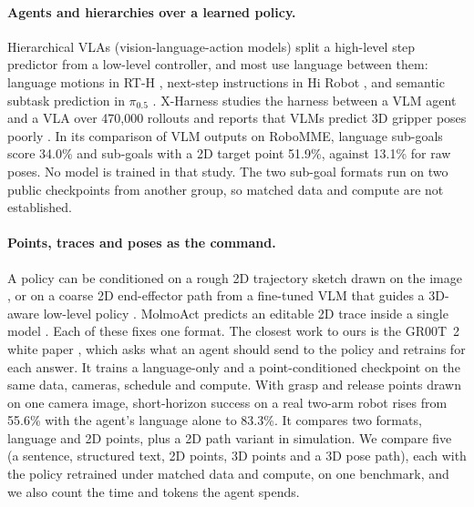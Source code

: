 \paragraph{Agents and hierarchies over a learned policy.}
Hierarchical VLAs (vision-language-action models) split a high-level step
predictor from a low-level controller, and most use language between them:
language motions in RT-H \citep{belkhale2024rth}, %
next-step instructions in Hi Robot \citep{shi2025hirobot}, %
and semantic subtask prediction in $\pi_{0.5}$ \citep{black2025pi05}.
X-Harness studies the harness between a VLM agent and a VLA over 470,000
rollouts and reports that VLMs predict 3D gripper poses poorly
\citep{lai2026xharness}. %
In its comparison of VLM outputs on RoboMME, language sub-goals score 34.0\%
and sub-goals with a 2D target point 51.9\%, against 13.1\% for raw poses.
No model is trained in that study. The two sub-goal formats run on two
public checkpoints from another group, so matched data and compute are not
established.

\paragraph{Points, traces and poses as the command.}
A policy can be conditioned on a rough 2D trajectory sketch drawn on the image
\citep{gu2023rttrajectory}, %
or on a coarse 2D end-effector path from a fine-tuned VLM that guides a
3D-aware low-level policy \citep{li2025hamster}. %
MolmoAct predicts an editable 2D trace inside a single model
\citep{lee2025molmoact}. %
Each of these fixes one format. The closest work to ours is the GR00T~2
white paper \citep{nvidia2026gr00t2}, %
which asks what an agent should send to the policy and retrains for each
answer. It trains a language-only and a point-conditioned checkpoint on the
same data, cameras, schedule and compute. With grasp and release points drawn
on one camera image, short-horizon success on a real two-arm robot rises from
55.6\% with the agent's language alone to 83.3\%.
It compares two formats, language and 2D points, plus a 2D path variant in
simulation. We compare five (a sentence, structured text, 2D points, 3D points
and a 3D pose path), each with the policy retrained under matched data and
compute, on one benchmark, and we also count the time and tokens the agent
spends.

